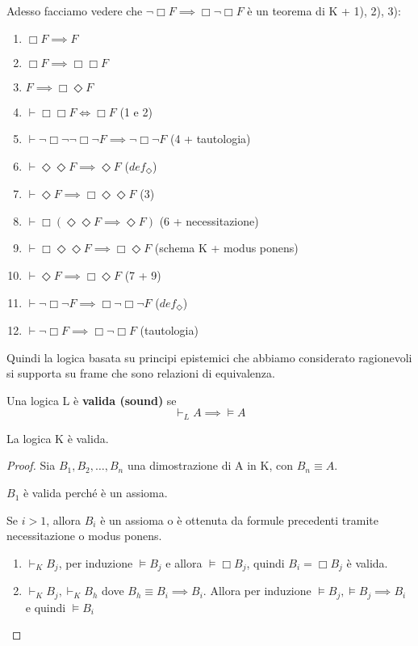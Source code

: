 \documentclass[../main.tex]{subfiles}
\begin{document}
Adesso facciamo vedere che $\neg \Box F \implies \Box \neg \Box F$ è un teorema di K + 1), 2), 3):
\begin{enumerate}
    \item $\Box F \implies F$
    \item $\Box F \implies \Box \Box F$
    \item $F \implies \Box \Diamond F$
    \item $\vdash \Box \Box F \iff \Box F$ (1 e 2)
    \item $\vdash \neg \Box \neg \neg \Box \neg F \implies \neg \Box \neg F$ (4 + tautologia)
    \item $\vdash \Diamond \Diamond F \implies \Diamond F$ ($def_\Diamond$)
    \item $\vdash \Diamond F \implies \Box \Diamond \Diamond F$ (3)
    \item $\vdash \Box(\Diamond \Diamond F \implies \Diamond F)$ (6 + necessitazione)
    \item $\vdash \Box \Diamond \Diamond F \implies \Box \Diamond F$ (schema K + modus ponens)
    \item $\vdash \Diamond F \implies \Box \Diamond F$ (7 + 9)
    \item $\vdash \neg \Box \neg F \implies \Box \neg \Box \neg F$ ($def_\Diamond$)
    \item $\vdash \neg \Box F \implies \Box \neg \Box F$ (tautologia)
\end{enumerate}
Quindi la logica basata su principi epistemici che abbiamo considerato ragionevoli si supporta su frame che sono relazioni di equivalenza.
\begin{definition}
    Una logica L è \textbf{valida (sound)} se
    \begin{equation*}
        \vdash_L A \implies \vDash A
    \end{equation*}
\end{definition}
\begin{theorem}
    La logica K è valida.
\end{theorem}
\begin{proof}
    Sia $B_1,B_2,\ldots,B_n$ una dimostrazione di A in K, con $B_n \equiv A$.

    $B_1$ è valida perché è un assioma.

    Se $i > 1$, allora $B_i$ è un assioma o è ottenuta da formule precedenti tramite necessitazione o modus ponens.
    \begin{enumerate}
        \item $\vdash_K B_j$, per induzione $\vDash B_j$ e allora $\vDash \Box B_j$, quindi $B_i = \Box B_j$ è valida.
        \item $\vdash_K B_j, \vdash_K B_h$ dove $B_h \equiv B_i \implies B_i$. Allora per induzione $\vDash B_j, \vDash B_j \implies B_i$\\
              e quindi $\vDash B_i$
    \end{enumerate}
\end{proof}
\end{document}
